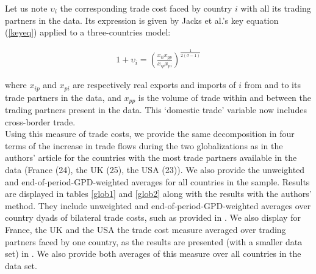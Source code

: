 \documentclass{article}
\begin{document}
Let us note $\upsilon_{i}$ the corresponding trade cost faced
by country $i$ with all its trading partners in the data. Its
expression is given by Jacks et al.'s key equation
(\ref{keyeq}) applied to a three-countries model:

\begin{eqnarray}
1+\upsilon_{i}=\left(\frac{x_{ii} x_{pp}}{x_{ip}
x_{pi}}\right)^{\frac{1}{2(\sigma-1)}} \label{keyeq3model}
\end{eqnarray}

where $x_{ip}$ and $x_{pi}$ are respectively real exports and
imports of $i$ from and to its trade partners in the data, and
$x_{pp}$ is the volume of trade within and between the trading
partners present in the data. This `domestic trade' variable
now
includes cross-border trade.\\

Using this measure of trade costs, we provide the same
decomposition in four terms of the increase in trade flows
during the two globalizations as in the authors' article for
the countries with the most trade partners available in the
data (France (24), the UK (25), the USA (23)). We also provide
the unweighted and end-of-period-GPD-weighted averages for all
countries in the sample. Results are displayed in tables
\ref{glob1} and \ref{glob2} along with the results with the
authors' method. They include unweighted and
end-of-period-GPD-weighted averages over country dyads of
bilateral trade costs, such as provided in \cite{JMN2011}. We
also display for France, the UK and the USA the trade cost
measure averaged over trading partners faced by one country, as
the results are presented (with a smaller data set) in
\cite{JMN2008, JMN2010}. We also provide both averages of this
measure over all countries in the data set.\\
\end{document}
